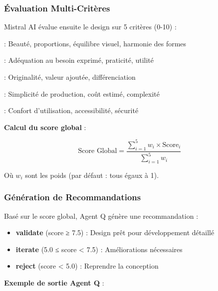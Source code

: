 \subsubsection{Évaluation Multi-Critères}

Mistral AI évalue ensuite le design sur 5 critères (0-10) :

\begin{description}[leftmargin=*]
    \item[Esthétique] : Beauté, proportions, équilibre visuel, harmonie des formes
    \item[Fonctionnel] : Adéquation au besoin exprimé, praticité, utilité
    \item[Innovant] : Originalité, valeur ajoutée, différenciation
    \item[Fabricable] : Simplicité de production, coût estimé, complexité
    \item[Ergonomique] : Confort d'utilisation, accessibilité, sécurité
\end{description}

\textbf{Calcul du score global} :

\begin{equation}
\text{Score Global} = \frac{\sum_{i=1}^{5} w_i \times \text{Score}_i}{\sum_{i=1}^{5} w_i}
\end{equation}

Où $w_i$ sont les poids (par défaut : tous égaux à 1).

\subsubsection{Génération de Recommandations}

Basé sur le score global, Agent Q génère une recommandation :

\begin{itemize}[leftmargin=*]
    \item \textbf{validate} (score ≥ 7.5) : Design prêt pour développement détaillé
    \item \textbf{iterate} (5.0 ≤ score < 7.5) : Améliorations nécessaires
    \item \textbf{reject} (score < 5.0) : Reprendre la conception
\end{itemize}

\textbf{Exemple de sortie Agent Q} :

